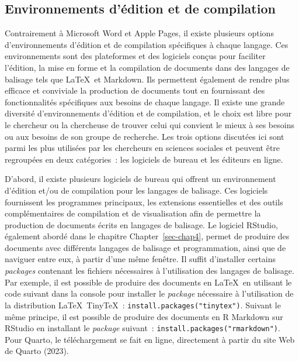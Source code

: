 \documentclass[
  letterpaper,
]{scrbook}
\begin{document}
\hypertarget{environnements-duxe9dition-et-de-compilation}{%
\subsection{Environnements d'édition et de
compilation}\label{environnements-duxe9dition-et-de-compilation}}

Contrairement à Microsoft Word et Apple Pages, il existe plusieurs
options d'environnements d'édition et de compilation spécifiques à
chaque langage. Ces environnements sont des plateformes et des logiciels
conçus pour faciliter l'édition, la mise en forme et la compilation de
documents dans des langages de balisage tels que \LaTeX~et Markdown. Ils
permettent également de rendre plus efficace et conviviale la production
de documents tout en fournissant des fonctionnalités spécifiques aux
besoins de chaque langage. Il existe une grande diversité
d'environnements d'édition et de compilation, et le choix est libre pour
le chercheur ou la chercheuse de trouver celui qui convient le mieux à
ses besoins ou aux besoins de son groupe de recherche. Les trois options
discutées ici sont parmi les plus utilisées par les chercheurs en
sciences sociales et peuvent être regroupées en deux catégories~: les
logiciels de bureau et les éditeurs en ligne.

D'abord, il existe plusieurs logiciels de bureau qui offrent un
environnement d'édition et/ou de compilation pour les langages de
balisage. Ces logiciels fournissent les programmes principaux, les
extensions essentielles et des outils complémentaires de compilation et
de visualisation afin de permettre la production de documents écrits en
langages de balisage. Le logiciel RStudio, également abordé dans le
chapitre Chapter~\ref{sec-chap4}, permet de produire des documents avec
différents langages de balisage et programmation, ainsi que de naviguer
entre eux, à partir d'une même fenêtre. Il suffit d'installer certains
\emph{packages} contenant les fichiers nécessaires à l'utilisation des
langages de balisage. Par exemple, il est possible de produire des
documents en \LaTeX~en utilisant le code suivant dans la console pour
installer le \emph{package} nécessaire à l'utilisation de la
distribution \LaTeX~Tiny\TeX~: \texttt{install.packages("tinytex")}.
Suivant le même principe, il est possible de produire des documents en R
Markdown sur RStudio en installant le \emph{package} suivant~:
\texttt{install.packages("rmarkdown")}. Pour Quarto, le téléchargement
se fait en ligne, directement à partir du site Web de Quarto (2023).
\end{document}
